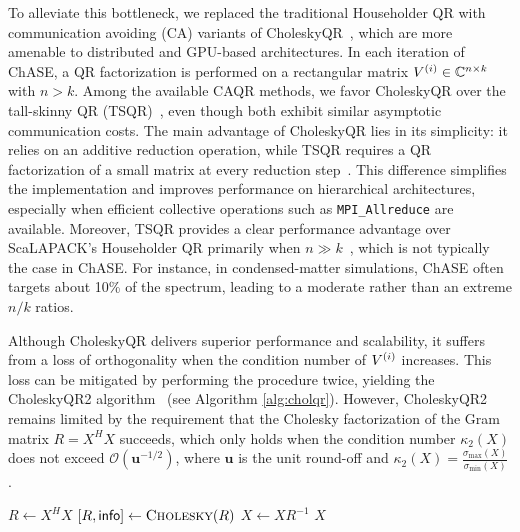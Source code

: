 To alleviate this bottleneck, we replaced the traditional Householder QR with communication avoiding (CA) variants of CholeskyQR~\cite{fukaya2014choleskyqr2,fukaya2020shifted}, which are more amenable to distributed and GPU-based architectures. In each iteration of ChASE, a QR factorization is performed on a rectangular matrix $V^{(i)} \in \mathbb{C}^{n \times k}$ with $n > k$. Among the available CAQR methods, we favor CholeskyQR over the tall-skinny QR (TSQR)~\cite{demmel2008communication}, even though both exhibit similar asymptotic communication costs. The main advantage of CholeskyQR lies in its simplicity: it relies on an additive reduction operation, while TSQR requires a QR factorization of a small matrix at every reduction step~\cite{fukaya2014choleskyqr2}. This difference simplifies the implementation and improves performance on hierarchical architectures, especially when efficient collective operations such as \texttt{MPI\_Allreduce} are available. Moreover, TSQR provides a clear performance advantage over ScaLAPACK’s Householder QR primarily when $n \gg k$~\cite{ballard2015reconstructing}, which is not typically the case in ChASE. For instance, in condensed-matter simulations, ChASE often targets about 10\% of the spectrum, leading to a moderate rather than an extreme $n/k$ ratios.

Although CholeskyQR delivers superior performance and scalability, it suffers from a loss of orthogonality when the condition number of $V^{(i)}$ increases. This loss can be mitigated by performing the procedure twice, yielding the CholeskyQR2 algorithm~\cite{fukaya2014choleskyqr2} (see Algorithm \ref{alg:cholqr}). However, CholeskyQR2 remains limited by the requirement that the Cholesky factorization of the Gram matrix $R = X^H X$ succeeds, which only holds when the condition number $\kappa_2(X)$ does not exceed $\mathcal{O}(\mathbf{u}^{-1/2})$, where $\mathbf{u}$ is the unit round-off and $\kappa_2(X) = \frac{\sigma_{\max}(X)}{\sigma_{\min}(X)}$.

\begin{algorithm}[htbp]
\caption{CholeskyQR for $X = QR$} \label{alg:cholqr}
\begin{algorithmic}[1]
      \State $R \leftarrow X^H X$
      \State $[R, {\sf info}] \leftarrow \textsc{Cholesky}(R)$
        \State {}
      \EndIf
      \State $X \leftarrow X R^{-1}$
    \EndFor
    \State \Return $X$
  \EndFunction
\end{algorithmic}
\end{algorithm}


